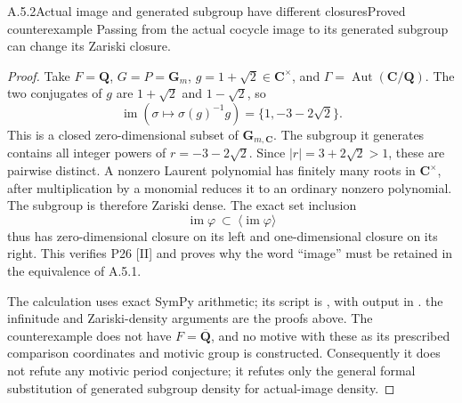 \begin{result}{A.5.2}{Actual image and generated subgroup have different closures}{Proved counterexample}
Passing from the actual cocycle image to its generated subgroup can change its Zariski closure.
\end{result}
\begin{proof}
Take \(F=\mathbf Q\), \(G=P=\mathbf G_m\),
\(g=1+\sqrt2\in\mathbf C^\times\), and
\(\Gamma=\operatorname{Aut}(\mathbf C/\mathbf Q)\). The two conjugates
of \(g\) are \(1+\sqrt2\) and \(1-\sqrt2\), so
\[
\operatorname{im}(\sigma\mapsto\sigma(g)^{-1}g)
=\{1,-3-2\sqrt2\}.
\]
This is a closed zero-dimensional subset of \(\mathbf G_{m,\mathbf C}\).
The subgroup it generates contains all integer powers of
\(r=-3-2\sqrt2\). Since \(|r|=3+2\sqrt2>1\), these are pairwise
distinct. A nonzero Laurent polynomial has finitely many roots in
\(\mathbf C^\times\), after multiplication by a monomial reduces it to
an ordinary nonzero polynomial. The subgroup is therefore Zariski dense.
The exact set inclusion
\[
\operatorname{im}\varphi\ \subset\ \langle\operatorname{im}\varphi\rangle
\]
thus has zero-dimensional closure on its left and one-dimensional closure
on its right. This verifies P26 {[}II{]} and proves why the word ``image'' must
be retained in the equivalence of A.5.1.

The calculation uses exact SymPy arithmetic; its script is
, with output in
.
the infinitude and Zariski-density arguments are the proofs above. The
counterexample does not have \(F=\overline{\mathbf Q}\), and no motive
with these as its prescribed comparison coordinates and motivic group is
constructed. Consequently it does not refute any motivic period
conjecture; it refutes only the general formal substitution of generated
subgroup density for actual-image density.
\end{proof}

